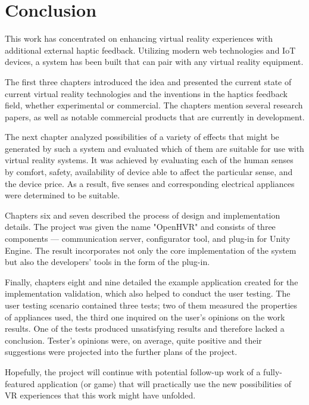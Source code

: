 \chapter{Conclusion}

This work has concentrated on enhancing virtual reality experiences with 
additional external haptic feedback. Utilizing modern web technologies and 
IoT devices, a system has been built that can pair with any virtual reality 
equipment.

The first three chapters introduced the idea and presented the current state 
of current virtual reality technologies and the inventions in the haptics 
feedback field, whether experimental or commercial. The chapters mention 
several research papers, as well as notable commercial products that are 
currently in development.

The next chapter analyzed possibilities of a variety of effects that might 
be generated by such a system and evaluated which of them are suitable 
for use with virtual reality systems. It was achieved by evaluating each 
of the human senses by comfort, safety, availability of device able to affect 
the particular sense, and the device price. As a result, five senses 
and corresponding electrical appliances were determined to be suitable.

Chapters six and seven described the process of design and implementation 
details. The project was given the name "OpenHVR" and consists of three 
components — communication server, configurator tool, and plug-in for Unity 
Engine. The result incorporates not only the core implementation of 
the system but also the developers' tools in the form of the plug-in.

Finally, chapters eight and nine detailed the example application created 
for the implementation validation, which also helped to conduct the user 
testing. The user testing scenario contained three tests; two of them measured 
the properties of appliances used, the third one inquired on the user's opinions
on the work results. One of the tests produced unsatisfying results 
and therefore lacked a conclusion. Tester's opinions were, on average, 
quite positive and their suggestions were projected into the 
further plans of the project.

Hopefully, the project will continue with potential follow-up work of a 
fully-featured application (or game) that will practically use the new 
possibilities of VR experiences that this work might have unfolded.
